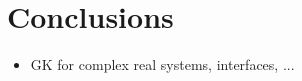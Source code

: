 \chapter{Conclusions}  \label{ch:conclusions}

\begin{itemize}
    \item GK for complex real systems, interfaces, ...
\end{itemize}